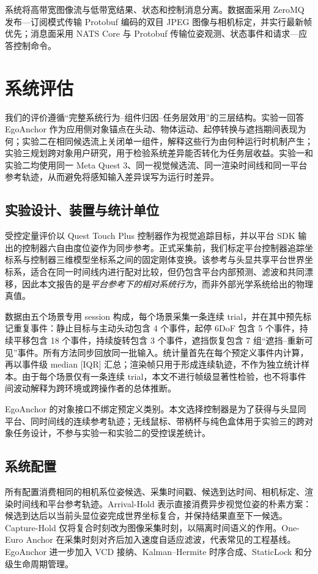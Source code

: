 \documentclass[9pt,twocolumn,letterpaper]{extarticle}
\begin{document}
系统将高带宽图像流与低带宽结果、状态和控制消息分离。数据面采用 ZeroMQ 发布---订阅模式传输 Protobuf 编码的双目 JPEG 图像与相机标定，并实行最新帧优先；消息面采用 NATS Core 与 Protobuf 传输位姿观测、状态事件和请求---应答控制命令。

\section{系统评估}\label{sec:eval}

我们的评价遵循“完整系统行为--组件归因--任务层效用”的三层结构。实验一回答 EgoAnchor 作为应用侧对象锚点在头动、物体运动、起停转换与遮挡期间表现为何；实验二在相同候选流上关闭单一组件，解释这些行为由何种运行时机制产生；实验三规划跨对象用户研究，用于检验系统差异能否转化为任务层收益。实验一和实验二均使用同一 Meta Quest 3、同一视觉候选流、同一渲染时间线和同一平台参考轨迹，从而避免将感知输入差异误写为运行时差异。

\subsection{实验设计、装置与统计单位}

受控定量评价以 Quest Touch Plus 控制器作为视觉追踪目标，并以平台 SDK 输出的控制器六自由度位姿作为同步参考。正式采集前，我们标定平台控制器追踪坐标系与控制器三维模型坐标系之间的固定刚体变换。该参考与头显共享平台世界坐标系，适合在同一时间线内进行配对比较，但仍包含平台内部预测、滤波和共同漂移，因此本文报告的是\emph{平台参考下的相对系统行为}，而非外部光学系统给出的物理真值。

数据由五个场景专用 session 构成，每个场景采集一条连续 trial，并在其中预先标记重复事件：静止目标与主动头动包含 4 个事件，起停 6DoF 包含 5 个事件，持续平移包含 18 个事件，持续旋转包含 3 个事件，遮挡恢复包含 7 组“遮挡--重新可见”事件。所有方法同步回放同一批输入。统计量首先在每个预定义事件内计算，再以事件级 median [IQR] 汇总；渲染帧只用于形成连续轨迹，不作为独立统计样本。由于每个场景仅有一条连续 trial，本文不进行帧级显著性检验，也不将事件间波动解释为跨环境或跨操作者的总体推断。

EgoAnchor 的对象接口不绑定预定义类别。本文选择控制器是为了获得与头显同平台、同时间线的连续参考轨迹；无线鼠标、带柄杯与纯色盒体用于实验三的跨对象任务设计，不参与实验一和实验二的受控误差统计。

\subsection{系统配置}

所有配置消费相同的相机系位姿候选、采集时间戳、候选到达时间、相机标定、渲染时间线和平台参考轨迹。Arrival-Hold 表示直接消费异步视觉位姿的朴素方案：候选到达后以当前头显位姿完成世界坐标复合，并保持结果直至下一候选。Capture-Hold 仅将复合时刻改为图像采集时刻，以隔离时间语义的作用。One-Euro Anchor 在采集时刻对齐后加入速度自适应滤波，代表常见的工程基线。EgoAnchor 进一步加入 VCD 接纳、Kalman--Hermite 时序合成、StaticLock 和分级生命周期管理。
\end{document}
